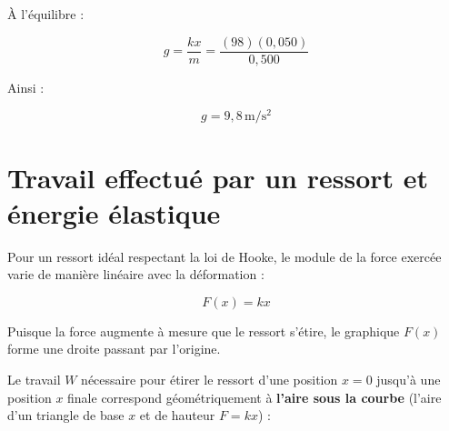 \documentclass[11pt,openany]{book}
\begin{document}
À l'équilibre :

\[
g = \frac{kx}{m} = \frac{(98)(0{,}050)}{0{,}500}
\]

Ainsi :

\[
\boxed{g = \mathrm{9{,}8\,m/s^2}}
\]

\section{Travail effectué par un ressort et énergie élastique}

Pour un ressort idéal respectant la loi de Hooke, le module de la force exercée varie de manière linéaire avec la déformation :

\[
F(x) = kx
\]

Puisque la force augmente à mesure que le ressort s'étire, le graphique $F(x)$ forme une droite passant par l'origine. 

Le travail $W$ nécessaire pour étirer le ressort d'une position $x = 0$ jusqu'à une position $x$ finale correspond géométriquement à \textbf{l'aire sous la courbe} (l'aire d'un triangle de base $x$ et de hauteur $F = kx$) :

\begin{center}
\end{center}
\end{document}
